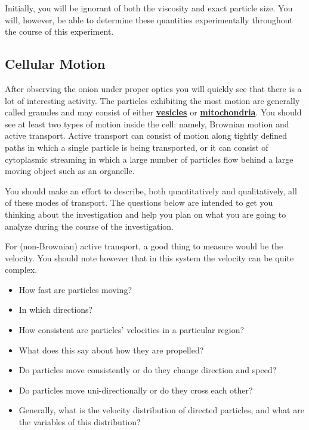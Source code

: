 \documentclass{../lab}
\begin{document}
Initially, you will be ignorant of both the viscosity and exact particle size. You will, however, be able to determine these quantities experimentally throughout the course of this experiment.

\subsection{Cellular Motion}

After observing the onion under proper optics you will quickly see that there is a lot of interesting activity. The particles exhibiting the most motion are generally called granules and may consist of either \href{http://en.wikipedia.org/wiki/Vesicle\_\%28biology\%29}{\textbf{vesicles}} or \href{http://physics111.lib.berkeley.edu/Physics111/Reprints/OTZ/biowikipedia.pdf}{\textbf{mitochondria}}. You should see at least two types of motion inside the cell: namely, Brownian motion and active transport. Active transport can consist of motion along tightly defined paths in which a single particle is being transported, or it can consist of cytoplasmic streaming in which a large number of particles flow behind a large moving object such as an organelle.

You should make an effort to describe, both quantitatively and qualitatively, all of these modes of transport. The questions below are intended to get you thinking about the investigation and help you plan on what you are going to analyze during the course of the investigation.

For (non-Brownian) active transport, a good thing to measure would be the velocity. You should note however that in this system the velocity can be quite complex.

\begin{itemize}
    \item How fast are particles moving?

    \item In which directions?

    \item How consistent are particles' velocities in a particular region?

    \item What does this say about how they are propelled?

    \item Do particles move consistently or do they change direction and speed?

    \item Do particles move uni-directionally or do they cross each other?

    \item Generally, what is the velocity distribution of directed particles, and what are the variables of this distribution?
\end{itemize}
\end{document}
